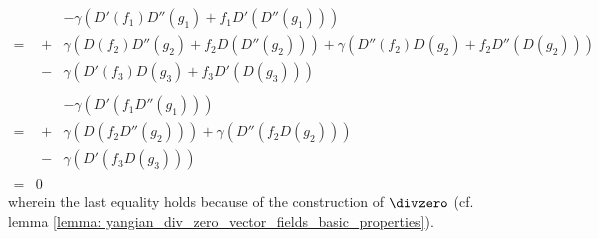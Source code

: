 \begin{enumerate}
$$\begin{aligned}
                                \\
                                = &
                                \begin{aligned}
                                    & -\gamma\left( D'(f_1) D''(g_1) + f_1 D' (D''(g_1)) \right)
                                    \\
                                    + & \gamma\left( D(f_2) D''(g_2) + f_2 D( D''(g_2) ) \right) + \gamma( D''(f_2) D(g_2) + f_2 D''( D(g_2) ) )
                                    \\
                                    - & \gamma\left( D'(f_3) D(g_3) + f_3 D'(D(g_3)) \right)
                                \end{aligned}
                                \\
                                = &
                                \begin{aligned}
                                    & -\gamma\left( D'( f_1 D''(g_1) ) \right)
                                    \\
                                    + & \gamma\left( D( f_2 D''(g_2) ) \right) + \gamma\left( D''( f_2 D(g_2) ) \right)
                                    \\
                                    - & \gamma\left( D'( f_3 D(g_3) ) \right)
                                \end{aligned}
                                \\
                                = & 0
                            \end{aligned}
                        $$
                    wherein the last equality holds because of the construction of $\divzero$ (cf. lemma \ref{lemma: yangian_div_zero_vector_fields_basic_properties}).
                \end{enumerate}

